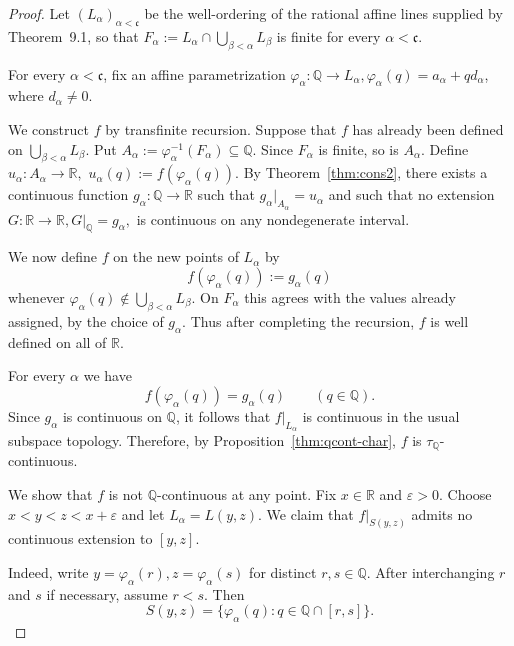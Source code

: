 \documentclass[11pt]{amsart} %
\theoremstyle{definition}
\newcommand{\Q}{\mathbb{Q}}
\begin{document}
\begin{proof}
Let $(L_\alpha)_{\alpha<\mathfrak{c}}$ be the well-ordering of the rational
affine lines supplied by Theorem~9.1, so that
$F_\alpha:=
L_\alpha\cap\bigcup_{\beta<\alpha}L_\beta$ 
is finite for every $\alpha<\mathfrak{c}$.

For every $\alpha<\mathfrak{c}$, fix an affine parametrization $
\varphi_\alpha\colon\mathbb Q\longrightarrow L_\alpha, 
\varphi_\alpha(q)=a_\alpha+q d_\alpha $,
where $d_\alpha\neq0$.

We construct $f$ by transfinite recursion. Suppose that $f$ has already
been defined on $
\bigcup_{\beta<\alpha}L_\beta.$ 
Put $
A_\alpha:=\varphi_\alpha^{-1}(F_\alpha)\subseteq\mathbb Q.$ 
Since $F_\alpha$ is finite, so is $A_\alpha$. Define
$
u_\alpha\colon A_\alpha\to\mathbb R,$ 
$u_\alpha(q):=f(\varphi_\alpha(q)).$
By Theorem~\ref{thm:cons2}, there exists a continuous function $
g_\alpha\colon\mathbb Q\to\mathbb R$ 
such that $
g_\alpha|_{A_\alpha}=u_\alpha$ 
and such that no extension $
G\colon\mathbb R\to\mathbb R, G|_{\mathbb Q}=g_\alpha,$
is continuous on any nondegenerate interval.

We now define $f$ on the new points of $L_\alpha$ by
\begin{equation} 
f(\varphi_\alpha(q)):=g_\alpha(q)
\end{equation} 
whenever $
\varphi_\alpha(q)\notin
\bigcup_{\beta<\alpha}L_\beta.$ 
On $F_\alpha$ this agrees with the values already assigned, by the
choice of $g_\alpha$. Thus after completing the recursion, $f$ is
well defined on all of $\mathbb R$.

For every $\alpha$ we have
\begin{equation} 
f(\varphi_\alpha(q))=g_\alpha(q)
\qquad(q\in\mathbb Q).
\end{equation} 
Since $g_\alpha$ is continuous on $\mathbb Q$, it follows that
$f|_{L_\alpha}$ is continuous in the usual subspace topology.
Therefore, by Proposition~\ref{thm:qcont-char}, $f$ is $\tau_{\Q}$-continuous.

We show that $f$ is not $\mathbb Q$-continuous at any point.
Fix $x\in\mathbb R$ and $\varepsilon>0$. Choose
$x<y<z<x+\varepsilon$ 
and let $L_\alpha=L(y,z)$. We claim that
$f|_{S(y,z)}$ admits no continuous extension to $[y,z]$.

Indeed, write $y=\varphi_\alpha(r),
z=\varphi_\alpha(s)$ 
for distinct $r,s\in\mathbb Q$. After interchanging $r$ and $s$ if
necessary, assume $r<s$. Then
\begin{equation} 
S(y,z)=\{\varphi_\alpha(q):q\in\mathbb Q\cap[r,s]\}.
\end{equation} 


\end{proof}
\end{document}
